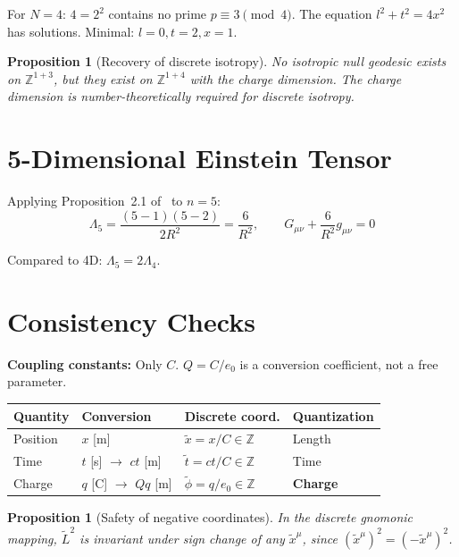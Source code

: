 \documentclass[12pt,a4paper]{article}
\newtheorem{proposition}[theorem]{Proposition}
\begin{document}
For $N=4$: $4 = 2^2$ contains no prime $p \equiv 3 \pmod{4}$. The equation $l^2 + t^2 = 4x^2$ has solutions. Minimal: $l=0, t=2, x=1$.

\begin{proposition}[Recovery of discrete isotropy]\label{prop:isotropy}
No isotropic null geodesic exists on $\mathbb{Z}^{1+3}$, but they exist on $\mathbb{Z}^{1+4}$ with the charge dimension. The charge dimension is number-theoretically required for discrete isotropy.
\end{proposition}

\section{5-Dimensional Einstein Tensor}

Applying Proposition~2.1 of~\cite{Paper1} to $n=5$:
\begin{equation}
\Lambda_5 = \frac{(5-1)(5-2)}{2R^2} = \frac{6}{R^2}, \qquad G_{\mu\nu} + \frac{6}{R^2}g_{\mu\nu} = 0 \tag{6.1--6.2}
\end{equation}

Compared to 4D: $\Lambda_5 = 2\Lambda_4$.

\section{Consistency Checks}

\textbf{Coupling constants:} Only $C$. $Q = C/e_0$ is a conversion coefficient, not a free parameter.

\begin{center}
\begin{tabular}{llll}
\toprule
Quantity & Conversion & Discrete coord. & Quantization \\
\midrule
Position & $x$ [m] & $\tilde{x} = x/C \in \mathbb{Z}$ & Length \\
Time & $t$ [s] $\to$ $ct$ [m] & $\tilde{t} = ct/C \in \mathbb{Z}$ & Time \\
Charge & $q$ [C] $\to$ $Qq$ [m] & $\tilde{\phi} = q/e_0 \in \mathbb{Z}$ & \textbf{Charge} \\
\bottomrule
\end{tabular}
\end{center}

\begin{proposition}[Safety of negative coordinates]\label{prop:safety}
In the discrete gnomonic mapping, $\tilde{L}^2$ is invariant under sign change of any $\tilde{x}^\mu$, since $(\tilde{x}^\mu)^2 = (-\tilde{x}^\mu)^2$.
\end{proposition}
\end{document}
